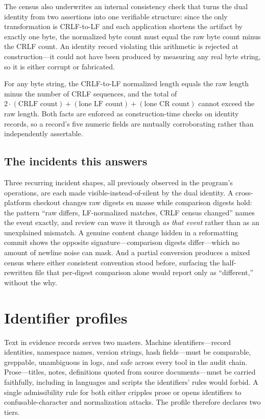 The census also underwrites an internal consistency check that turns the
dual identity from two assertions into one verifiable structure: since
the only transformation is CRLF-to-LF and each application shortens the
artifact by exactly one byte, the normalized byte count must equal the
raw byte count minus the CRLF count. An identity record violating this
arithmetic is rejected at construction---it could not have been produced
by measuring any real byte string, so it is either corrupt or fabricated.

\begin{proposition}\label{ch05:prop:census}
For any byte string, the CRLF-to-LF normalized length equals the raw
length minus the number of CRLF sequences, and the total of
$2\cdot(\textrm{CRLF count}) + (\textrm{lone LF count}) + (\textrm{lone
CR count})$ cannot exceed the raw length. Both facts are enforced as
construction-time checks on identity records, so a record's five numeric
fields are mutually corroborating rather than independently assertable.
\end{proposition}

\subsection{The incidents this answers}

Three recurring incident shapes, all previously observed in the program's
operations, are each made visible-instead-of-silent by the dual identity.
A cross-platform checkout changes raw digests en masse while comparison
digests hold: the pattern ``raw differs, LF-normalized matches, CRLF
census changed'' names the event exactly, and review can wave it through
\emph{as that event} rather than as an unexplained mismatch. A genuine
content change hidden in a reformatting commit shows the opposite
signature---comparison digests differ---which no amount of newline noise
can mask. And a partial conversion produces a mixed census where either
consistent convention stood before, surfacing the half-rewritten file
that per-digest comparison alone would report only as ``different,''
without the why.

\section{Identifier profiles}\label{ch05:identifiers}

Text in evidence records serves two masters. Machine identifiers---record
identities, namespace names, version strings, hash fields---must be
comparable, greppable, unambiguous in logs, and safe across every tool in
the audit chain. Prose---titles, notes, definitions quoted from source
documents---must be carried faithfully, including in languages and scripts
the identifiers' rules would forbid. A single admissibility rule for both
either cripples prose or opens identifiers to confusable-character and
normalization attacks. The profile therefore declares two tiers.

